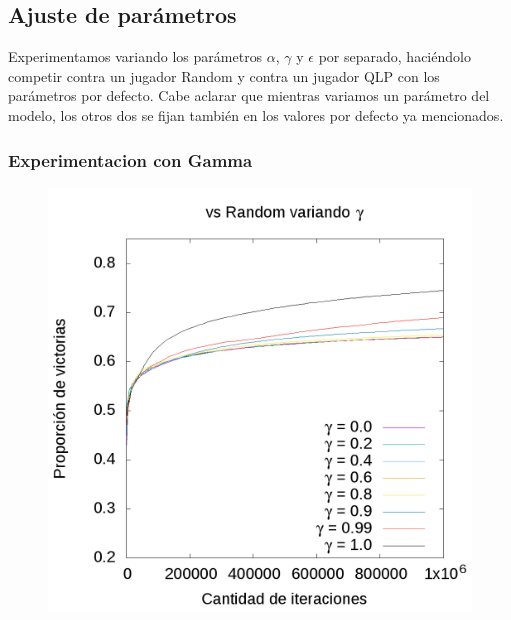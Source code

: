 \documentclass[10pt, a4paper]{article}
\begin{document}
\subsection{Ajuste de parámetros}


Experimentamos variando los parámetros $\alpha$, $\gamma$ y $\epsilon$ por separado, haciéndolo competir contra un jugador Random y contra un jugador QLP con los parámetros por defecto.
Cabe aclarar que mientras variamos un parámetro del modelo, los otros dos se fijan también en los valores por defecto ya mencionados.

\subsubsection{Experimentacion con Gamma}

\begin{figure}[H]
 \centering
  \begin{minipage}[c]{1\textwidth}
	\includegraphics[scale=0.2]{GammaR.png}

\end{minipage}
\end{figure}
\end{document}
